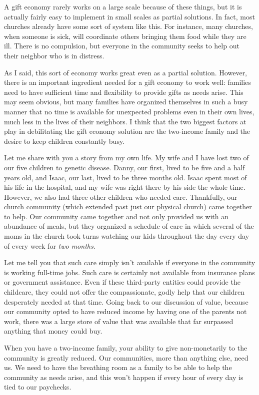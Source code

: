 A gift economy rarely works on a large scale
because of these
things, but it is actually fairly easy to implement in small scales as
partial solutions. In fact, most churches already have some sort of
system like this. For instance, many churches, when someone is sick,
will coordinate others bringing them food while they are ill. There is
no compulsion, but everyone in the community seeks to help out their
neighbor who is in distress. 

As I said, this sort of economy works great even as a partial solution.
However, there is an important ingredient needed for a gift economy to
work well: families need to have sufficient time and flexibility to
provide gifts as needs arise. This may seem obvious, but many families
have organized themselves in such a busy manner that no time is
available for unexpected problems even in their own lives, much less in
the lives of their neighbors.  I think that the two biggest
factors at play in
debilitating the gift economy solution are the two-income family and
the desire to
keep children
constantly busy.

Let me share with you a story from my own life. My wife and I have lost
two of our five children to genetic disease. Danny, our first, lived to
be five and a half years old, and Isaac, our last, lived to be three
months old. Isaac spent most of his life in the hospital, and my wife
was right there by his side the whole time. However, we also had three
other children who needed care. Thankfully, our church community (which
extended past just our physical church) came together to help. Our
community came together and not only provided us with an abundance of
meals, but they organized a schedule of care in which several of the
moms in the church took turns watching our kids throughout the day
every day of every week for \textit{two months}. 

Let me tell you that such care simply isn’t available if everyone in the
community is working full-time jobs. Such care is certainly not
available from insurance plans or government assistance. Even if these
third-party entities could provide the childcare, they could not offer
the compassionate,
godly help that our children desperately needed at that time. Going
back to our discussion of value, because our community opted to have
reduced income by having one of the parents not work, there was a large
store of value that was available that far surpassed anything that
money could buy.

When you have a two-income family, your ability to give non-monetarily
to the community is greatly reduced. Our communities, more than
anything else, need us. We need to have the breathing room as a family
to be able to help the community as needs arise, and this won’t happen
if every hour of every day is tied to our paychecks.

